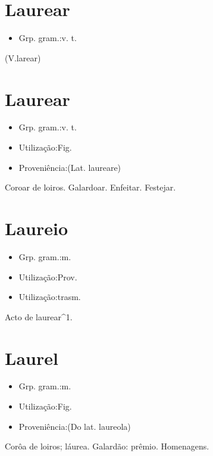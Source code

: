 \section{Laurear}
\begin{itemize}
\item {Grp. gram.:v. t.}
\end{itemize}
(V.larear)
\section{Laurear}
\begin{itemize}
\item {Grp. gram.:v. t.}
\end{itemize}
\begin{itemize}
\item {Utilização:Fig.}
\end{itemize}
\begin{itemize}
\item {Proveniência:(Lat. \textunderscore laureare\textunderscore )}
\end{itemize}
Coroar de loiros.
Galardoar.
Enfeitar.
Festejar.
\section{Laureio}
\begin{itemize}
\item {Grp. gram.:m.}
\end{itemize}
\begin{itemize}
\item {Utilização:Prov.}
\end{itemize}
\begin{itemize}
\item {Utilização:trasm.}
\end{itemize}
Acto de laurear^1.
\section{Laurel}
\begin{itemize}
\item {Grp. gram.:m.}
\end{itemize}
\begin{itemize}
\item {Utilização:Fig.}
\end{itemize}
\begin{itemize}
\item {Proveniência:(Do lat. \textunderscore laureola\textunderscore )}
\end{itemize}
Corôa de loiros; láurea.
Galardão: prêmio.
Homenagens.
